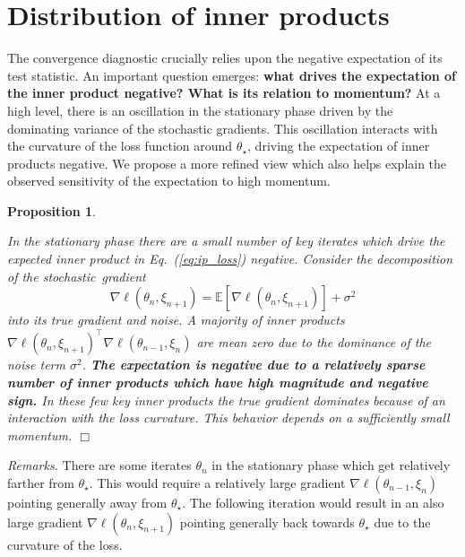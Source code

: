 \documentclass[conference]{IEEEtran}
\newcommand{\Ex}[1]{\mathbb{E}[ #1 ]}
\newtheorem{proposition}[theorem]{Proposition}
\begin{document}
\section{Distribution  of inner products}\label{sec:distribution_IP} 

The convergence diagnostic crucially relies upon the negative expectation of its test statistic. 
An important question emerges: \textbf{what drives the expectation of the inner product negative?
What is its relation to momentum?}
At a high level, there is an oscillation in the stationary phase driven by the dominating variance of the stochastic gradients.
This oscillation interacts with the curvature of the loss function around $\theta_\star$, driving the expectation of inner products negative.
We propose a more refined view which also helps explain the observed sensitivity of the expectation to high momentum.

\begin{proposition}\label{prop:noise_key_iter}

In the stationary phase there are a small number of key iterates which drive the expected inner product in Eq.~(\ref{eq:ip_loss}) negative.
Consider the decomposition of the stochastic~gradient
\begin{equation*}
\nabla \ell ( \theta_n, \xi_{n+1} ) = \Ex{ \nabla \ell ( \theta_n, \xi_{n+1} )} + \sigma^2
\end{equation*}
into its true gradient and noise.  A majority of inner products\\ $\nabla \ell ( \theta_n, \xi_{n+1} ) ^\top \nabla \ell ( \theta_{n-1}, \xi_{n} )$ are mean zero due to the dominance of the noise term $\sigma^2$.  \textbf{The expectation is negative due to a relatively sparse number of inner products which have high magnitude and negative sign.}
In these few key inner products the true gradient dominates because of an interaction with the loss curvature.
This behavior depends on a sufficiently small momentum.
\hfill$\Box$
\end{proposition}

\emph{Remarks.}
There are some iterates $\theta_n$ in the stationary phase which get relatively farther from $\theta_\star$.
This would require a relatively large gradient $\nabla \ell (\theta_{n-1}, \xi_n)$ pointing generally away from $\theta_\star$.
The following iteration would result in an also large gradient $\nabla \ell (\theta_{n}, \xi_{n+1})$ pointing generally back towards $\theta_\star$ due to the curvature of the loss. 
\end{document}
